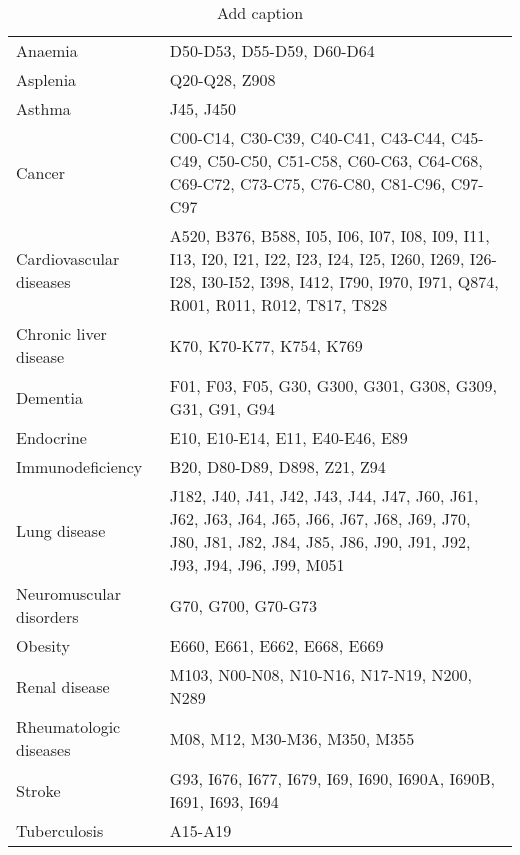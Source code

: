 \begin{table}[htbp]
  \centering
  \caption{Add caption}
    \begin{tabular}{l|l}
\cmidrule{1-1}    \rowcolor[rgb]{ .863,  .902,  .945} Anaemia & \cellcolor[rgb]{ 1,  1,  1}D50-D53, D55-D59, D60-D64 \\
\cmidrule{1-1}    Asplenia & Q20-Q28, Z908 \\
\cmidrule{1-1}    Asthma & J45, J450 \\
\cmidrule{1-1}    Cancer & C00-C14, C30-C39, C40-C41, C43-C44, C45-C49, C50-C50, C51-C58, C60-C63, C64-C68, C69-C72, C73-C75, C76-C80, C81-C96, C97-C97 \\
\cmidrule{1-1}    Cardiovascular diseases & A520, B376, B588, I05, I06, I07, I08, I09, I11, I13, I20, I21, I22, I23, I24, I25, I260, I269, I26-I28, I30-I52, I398, I412, I790, I970, I971, Q874, R001, R011, R012, T817, T828 \\
\cmidrule{1-1}    \rowcolor[rgb]{ .863,  .902,  .945} Chronic liver disease & \cellcolor[rgb]{ 1,  1,  1}K70, K70-K77, K754, K769 \\
\cmidrule{1-1}    \rowcolor[rgb]{ .863,  .902,  .945} Dementia & \cellcolor[rgb]{ 1,  1,  1}F01, F03, F05, G30, G300, G301, G308, G309, G31, G91, G94 \\
\cmidrule{1-1}    Endocrine & E10, E10-E14, E11, E40-E46, E89 \\
\cmidrule{1-1}    \rowcolor[rgb]{ .863,  .902,  .945} Immunodeficiency  & \cellcolor[rgb]{ 1,  1,  1}B20, D80-D89, D898, Z21, Z94 \\
\cmidrule{1-1}    Lung disease & J182, J40, J41, J42, J43, J44, J47, J60, J61, J62, J63, J64, J65, J66, J67, J68, J69, J70, J80, J81, J82, J84, J85, J86, J90, J91, J92, J93, J94, J96, J99, M051 \\
\cmidrule{1-1}    Neuromuscular disorders & G70, G700, G70-G73 \\
\cmidrule{1-1}    \rowcolor[rgb]{ .863,  .902,  .945} Obesity & \cellcolor[rgb]{ 1,  1,  1}E660, E661, E662, E668, E669 \\
\cmidrule{1-1}    Renal disease & M103, N00-N08, N10-N16, N17-N19, N200, N289 \\
\cmidrule{1-1}    Rheumatologic diseases & M08, M12, M30-M36, M350, M355 \\
\cmidrule{1-1}    Stroke & G93, I676, I677, I679, I69, I690, I690A, I690B, I691, I693, I694 \\
\cmidrule{1-1}    \rowcolor[rgb]{ .863,  .902,  .945} Tuberculosis & \cellcolor[rgb]{ 1,  1,  1}A15-A19 \\
\cmidrule{1-1}    \end{tabular}%
  \label{tab:addlabel}%
\end{table}%
